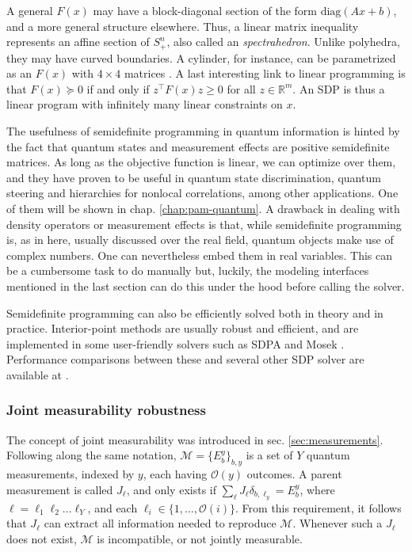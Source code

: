 			A general $F(x)$ may have a block-diagonal section of the form $\text{diag}(Ax + b)$, and a more general structure elsewhere. Thus, a linear matrix inequality represents an affine section of $S_+^n$, also called an \emph{spectrahedron}. Unlike polyhedra, they may have curved boundaries. A cylinder, for instance, can be parametrized as an $F(x)$ with $4 \times 4$ matrices \cite{vinzant_spectrahedron_2014}. A last interesting link to linear programming is that $F(x) \succeq 0$ if and only if $z^\intercal F(x) z \geq 0$ for all $z \in \mathbb{R}^m$. An SDP is thus a linear program with infinitely many linear constraints on $x$.

			The usefulness of semidefinite programming in quantum information is hinted by the fact that quantum states and measurement effects are positive semidefinite matrices. As long as the objective function is linear, we can optimize over them, and they have proven to be useful in quantum state discrimination, quantum steering and hierarchies for nonlocal correlations, among other applications. One of them will be shown in chap. \ref{chap:pam-quantum}. A drawback in dealing with density operators or measurement effects is that, while semidefinite programming is, as in here, usually discussed over the real field, quantum objects make use of complex numbers. One can nevertheless embed them in real variables. This can be a cumbersome task to do manually but, luckily, the modeling interfaces mentioned in the last section can do this under the hood before calling the solver.

			Semidefinite programming can also be efficiently solved both in theory and in practice. Interior-point methods are usually robust and efficient, and are implemented in some user-friendly solvers such as SDPA \cite{sdpa} and Mosek \cite{mosek}. Performance comparisons between these and several other SDP solver are available at \cite{performance_sdp_solvers}.


			\subsubsection{Joint measurability robustness}
			\label{sec:incompatibility-robustness}

				The concept of joint measurability was introduced in sec. \ref{sec:measurements}. Following along the same notation, $\mathcal{M} = \{E_b^y \}_{b, y}$ is a set of $Y$ quantum measurements, indexed by $y$, each having $\mathcal{O}(y)$ outcomes. A parent measurement is called $J_\ell$, and only exists if $\sum_\ell J_\ell \delta_{b, \ell_y} = E_b^y$, where $\ell = \ell_1\ell_2\ldots\ell_Y$, and each $\ell_i \in \{ 1, \ldots, \mathcal{O}(i) \}$. From this requirement, it follows that $J_\ell$ can extract all information needed to reproduce $\mathcal{M}$. Whenever such a $J_\ell$ does not exist, $\mathcal{M}$ is incompatible, or not jointly measurable.

